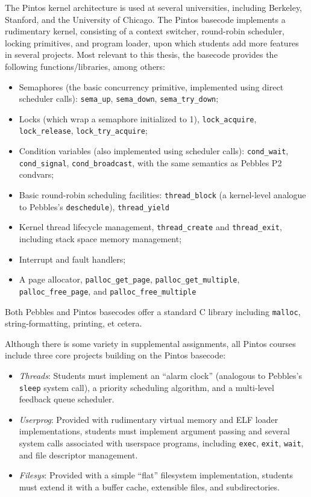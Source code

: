 The Pintos kernel architecture \cite{pintos} is used at several universities, including Berkeley, Stanford, and the University of Chicago.
The Pintos basecode implements a rudimentary kernel, consisting of a context switcher, round-robin scheduler, locking primitives, and program loader,
upon which students add more features in several projects.
Most relevant to this thesis, the basecode provides the following functions/libraries, among others:
\begin{itemize}
	\item Semaphores (the basic concurrency primitive, implemented using direct scheduler calls): {\tt sema\_up}, {\tt sema\_down}, {\tt sema\_try\_down};
	\item Locks (which wrap a semaphore initialized to 1), {\tt lock\_acquire}, {\tt lock\_\allowbreak{}release}, {\tt lock\_try\_acquire};
	\item Condition variables (also implemented using scheduler calls): {\tt cond\_wait}, {\tt cond\_\allowbreak{}signal}, {\tt cond\_broadcast}, with the same semantics as Pebbles P2 condvars;
	\item Basic round-robin scheduling facilities: {\tt thread\_block} (a kernel-level analogue to Pebbles's {\tt deschedule}), {\tt thread\_yield}
	\item Kernel thread lifecycle management, {\tt thread\_create} and {\tt thread\_exit}, including stack space memory management;
	\item Interrupt and fault handlers;
	\item A page allocator, {\tt palloc\_get\_page}, {\tt palloc\_get\_multiple}, {\tt palloc\_free\_page}, and {\tt palloc\_free\_multiple}
\end{itemize}
Both Pebbles and Pintos basecodes offer a standard C library including {\tt malloc}, string-formatting, printing, et cetera.

Although there is some variety in supplemental assignments, all Pintos courses include three core projects building on the Pintos basecode:
\begin{itemize}
	\item {\em Threads}: Students must implement an ``alarm clock'' (analogous to Pebbles's {\tt sleep} system call),
		a priority scheduling algorithm, and a multi-level feedback queue scheduler.
	\item {\em Userprog}: Provided with rudimentary virtual memory and ELF loader implementations, students must implement argument passing and several system calls associated with userspace programs, including {\tt exec}, {\tt exit}, {\tt wait}, and file descriptor management.
	\item {\em Filesys}: Provided with a simple ``flat'' filesystem implementation, students must extend it with a buffer cache, extensible files, and subdirectories.
\end{itemize}

